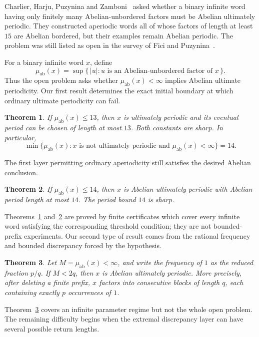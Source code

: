 \documentclass[11pt]{article}
\newtheorem{theorem}{Theorem}[section]
\begin{document}
Charlier, Harju, Puzynina and Zamboni~\cite{CHPZ} asked whether a binary
infinite word having only finitely many Abelian-unbordered factors must be
Abelian ultimately periodic. They constructed aperiodic words all of whose
factors of length at least $15$ are Abelian bordered, but their examples
remain Abelian periodic. The problem was still listed as open in the survey
of Fici and Puzynina~\cite[Problem~42]{FP}.

For a binary infinite word $x$, define
\[
\mu_{\mathrm{ab}}(x)=\sup\{\,|u|:u\text{ is an Abelian-unbordered factor of }x\,\}.
\]
Thus the open problem asks whether $\mu_{\mathrm{ab}}(x)<\infty$ implies
Abelian ultimate periodicity. Our first result determines the exact initial
boundary at which ordinary ultimate periodicity can fail.

\begin{theorem}\label{thm:ordinary}
If $\mu_{\mathrm{ab}}(x)\le13$, then $x$ is ultimately periodic and its
eventual period can be chosen of length at most $13$. Both constants are
sharp. In particular,
\[
\min\{\mu_{\mathrm{ab}}(x):x\text{ is not ultimately periodic and }
\mu_{\mathrm{ab}}(x)<\infty\}=14.
\]
\end{theorem}

The first layer permitting ordinary aperiodicity still satisfies the desired
Abelian conclusion.

\begin{theorem}\label{thm:abelian}
If $\mu_{\mathrm{ab}}(x)\le14$, then $x$ is Abelian ultimately periodic with
Abelian period length at most $14$. The period bound $14$ is sharp.
\end{theorem}

Theorems~\ref{thm:ordinary} and~\ref{thm:abelian} are proved by finite
certificates which cover every infinite word satisfying the corresponding
threshold condition; they are not bounded-prefix experiments. Our second
type of result comes from the rational frequency and bounded discrepancy
forced by the hypothesis.

\begin{theorem}\label{thm:denominator}
Let $M=\mu_{\mathrm{ab}}(x)<\infty$, and write the frequency of $1$ as the
reduced fraction $p/q$. If $M<2q$, then $x$ is Abelian ultimately periodic.
More precisely, after deleting a finite prefix, $x$ factors into consecutive
blocks of length $q$, each containing exactly $p$ occurrences of $1$.
\end{theorem}

Theorem~\ref{thm:denominator} covers an infinite parameter regime but not the
whole open problem. The remaining difficulty begins when the extremal
discrepancy layer can have several possible return lengths.
\end{document}
